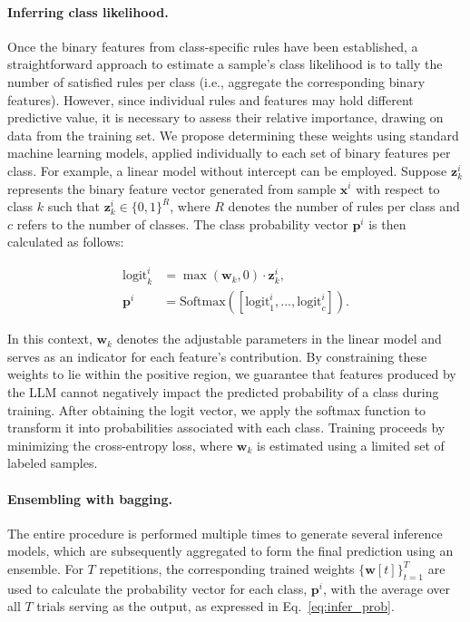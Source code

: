 \paragraph{Inferring class likelihood.} Once the binary features from class-specific rules have been established, a straightforward approach to estimate a sample’s class likelihood is to tally the number of satisfied rules per class (i.e., aggregate the corresponding binary features). However, since individual rules and features may hold different predictive value, it is necessary to assess their relative importance, drawing on data from the training set. We propose determining these weights using standard machine learning models, applied individually to each set of binary features per class. For example, a linear model without intercept can be employed. Suppose $\mathbf{z}_k^i$ represents the binary feature vector generated from sample $\mathbf{x}^i$ with respect to class $k$ such that $\mathbf{z}_k^i \in \{0, 1\}^R$, where $R$ denotes the number of rules per class and $c$ refers to the number of classes. The class probability vector $\mathbf{p}^i$ is then calculated as follows:

\begin{align}
\text{logit}_k^i &= \max(\mathbf{w}_k, 0) \cdot \mathbf{z}_k^i, \nonumber \\
\mathbf{p}^i &= \text{Softmax}({[\text{logit}_{1}^i, ..., \text{logit}_{c}^i]}). \label{eq:infer_prob}
\end{align}

In this context, $\mathbf{w}_k$ denotes the adjustable parameters in the linear model and serves as an indicator for each feature's contribution. By constraining these weights to lie within the positive region, we guarantee that features produced by the LLM cannot negatively impact the predicted probability of a class during training. After obtaining the logit vector, we apply the softmax function to transform it into probabilities associated with each class. Training proceeds by minimizing the cross-entropy loss, where $\mathbf{w}_k$ is estimated using a limited set of labeled samples.

\vspace*{-0.12in}
\paragraph{Ensembling with bagging.} The entire procedure is performed multiple times to generate several inference models, which are subsequently aggregated to form the final prediction using an ensemble. For $T$ repetitions, the corresponding trained weights $\{\mathbf{w}[t]\}_{t=1}^T$ are used to calculate the probability vector for each class, $\mathbf{p}^i$, with the average over all $T$ trials serving as the output, as expressed in Eq.~\ref{eq:infer_prob}.

